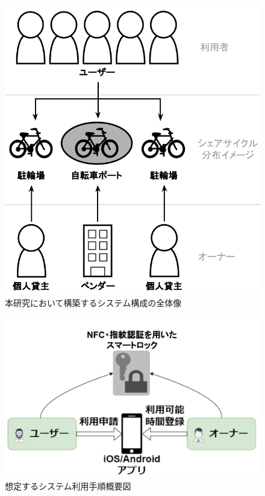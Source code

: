          \begin{figure}[htbp]
            \centering
            \includegraphics[scale=0.34]
            {figures/OverallImageOfSystemConfiguration.png}
            \caption{本研究において構築するシステム構成の全体像}
            \label{fig:本研究において構築するシステム構成の全体像}
          \end{figure}
          
          \begin{figure}[htbp]
            \centering
            \includegraphics[scale=0.15]
            {figures/howToUse.png}
            \caption{想定するシステム利用手順概要図}
            \label{fig:想定するシステム利用手順概要図}
          \end{figure}
      
